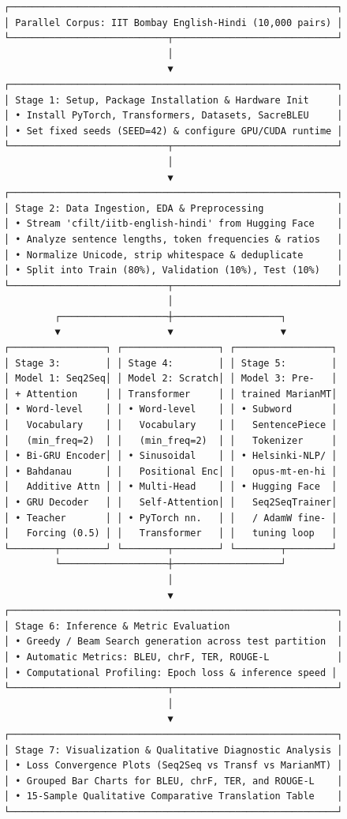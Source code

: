 \documentclass[12pt,a4paper,oneside]{report}
\begin{document}
\begin{Verbatim}[breaklines=true,breakanywhere=true,fontsize=\scriptsize,frame=leftline,framesep=2mm]
┌──────────────────────────────────────────────────────────┐
│ Parallel Corpus: IIT Bombay English-Hindi (10,000 pairs) │
└────────────────────────────┬─────────────────────────────┘
                             │
                             ▼
┌──────────────────────────────────────────────────────────┐
│ Stage 1: Setup, Package Installation & Hardware Init     │
│ • Install PyTorch, Transformers, Datasets, SacreBLEU     │
│ • Set fixed seeds (SEED=42) & configure GPU/CUDA runtime │
└────────────────────────────┬─────────────────────────────┘
                             │
                             ▼
┌──────────────────────────────────────────────────────────┐
│ Stage 2: Data Ingestion, EDA & Preprocessing             │
│ • Stream 'cfilt/iitb-english-hindi' from Hugging Face    │
│ • Analyze sentence lengths, token frequencies & ratios   │
│ • Normalize Unicode, strip whitespace & deduplicate      │
│ • Split into Train (80%), Validation (10%), Test (10%)   │
└────────────────────────────┬─────────────────────────────┘
                             │
         ┌───────────────────┼───────────────────┐
         ▼                   ▼                   ▼
┌─────────────────┐ ┌─────────────────┐ ┌─────────────────┐
│ Stage 3:        │ │ Stage 4:        │ │ Stage 5:        │
│ Model 1: Seq2Seq│ │ Model 2: Scratch│ │ Model 3: Pre-   │
│ + Attention     │ │ Transformer     │ │ trained MarianMT│
│ • Word-level    │ │ • Word-level    │ │ • Subword       │
│   Vocabulary    │ │   Vocabulary    │ │   SentencePiece │
│   (min_freq=2)  │ │   (min_freq=2)  │ │   Tokenizer     │
│ • Bi-GRU Encoder│ │ • Sinusoidal    │ │ • Helsinki-NLP/ │
│ • Bahdanau      │ │   Positional Enc│ │   opus-mt-en-hi │
│   Additive Attn │ │ • Multi-Head    │ │ • Hugging Face  │
│ • GRU Decoder   │ │   Self-Attention│ │   Seq2SeqTrainer│
│ • Teacher       │ │ • PyTorch nn.   │ │   / AdamW fine- │
│   Forcing (0.5) │ │   Transformer   │ │   tuning loop   │
└────────┬────────┘ └────────┬────────┘ └────────┬────────┘
         └───────────────────┼───────────────────┘
                             │
                             ▼
┌──────────────────────────────────────────────────────────┐
│ Stage 6: Inference & Metric Evaluation                   │
│ • Greedy / Beam Search generation across test partition  │
│ • Automatic Metrics: BLEU, chrF, TER, ROUGE-L            │
│ • Computational Profiling: Epoch loss & inference speed │
└────────────────────────────┬─────────────────────────────┘
                             │
                             ▼
┌──────────────────────────────────────────────────────────┐
│ Stage 7: Visualization & Qualitative Diagnostic Analysis │
│ • Loss Convergence Plots (Seq2Seq vs Transf vs MarianMT) │
│ • Grouped Bar Charts for BLEU, chrF, TER, and ROUGE-L    │
│ • 15-Sample Qualitative Comparative Translation Table    │
└──────────────────────────────────────────────────────────┘
\end{Verbatim}
\end{document}
